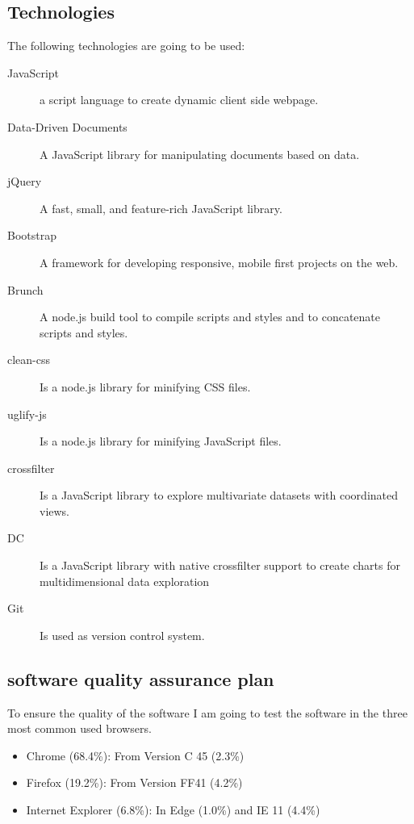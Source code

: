 \documentclass{acmsiggraph}               %
\begin{document}
\subsection{Technologies} %
\label{sub:technologies}

The following technologies are going to be used:
\begin{description}
  \item[JavaScript] a script language to create dynamic client side webpage.
  \item[Data-Driven Documents] A JavaScript library for manipulating documents based on data.\cite{D3}
  \item[jQuery] A fast, small, and feature-rich JavaScript library.\cite{jQ}
  \item[Bootstrap] A framework for developing responsive, mobile first projects on the web.\cite{BS}
  \item[Brunch] A node.js \cite{node} build tool to compile scripts and styles and to concatenate scripts and styles. \cite{brunsh}
  \item[clean-css] Is a node.js \cite{node} library for minifying CSS files.
  \item[uglify-js] Is a node.js \cite{node} library for minifying JavaScript files.
  \item[crossfilter] Is a JavaScript library to explore multivariate datasets with coordinated views. \cite{crossfilter}
  \item[DC] Is a JavaScript library with native crossfilter support to create charts for multidimensional data exploration\cite{dc} 
  \item[Git] Is used as version control system. 
\end{description}

\subsection{software quality assurance plan} %
\label{sub:software_quality_assurance_plan}

To ensure the quality of the software I am going to test the software in the three most common used browsers. \cite{browserStatistics}
\begin{itemize}
  \item Chrome (68.4\%): From Version C 45 (2.3\%)
  \item Firefox (19.2\%): From Version FF41 (4.2\%)
  \item Internet Explorer (6.8\%):  In Edge (1.0\%) and IE 11 (4.4\%) 
\end{itemize}
\end{document}
